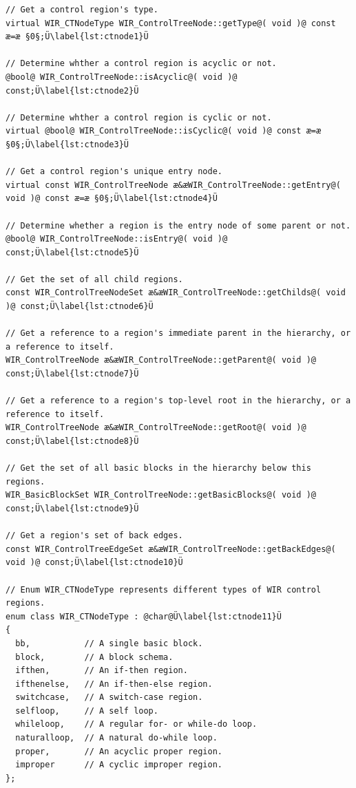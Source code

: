 \begin{lstlisting}[style=code,float=!t,caption={Public Interface of Class \texttt{WIR\_ControlTreeNode}},label=lst:ctnode]
// Get a control region's type.
virtual WIR_CTNodeType WIR_ControlTreeNode::getType@( void )@ const æ=æ §0§;Ü\label{lst:ctnode1}Ü

// Determine whther a control region is acyclic or not.
@bool@ WIR_ControlTreeNode::isAcyclic@( void )@ const;Ü\label{lst:ctnode2}Ü

// Determine whther a control region is cyclic or not.
virtual @bool@ WIR_ControlTreeNode::isCyclic@( void )@ const æ=æ §0§;Ü\label{lst:ctnode3}Ü

// Get a control region's unique entry node.
virtual const WIR_ControlTreeNode æ&æWIR_ControlTreeNode::getEntry@( void )@ const æ=æ §0§;Ü\label{lst:ctnode4}Ü

// Determine whether a region is the entry node of some parent or not.
@bool@ WIR_ControlTreeNode::isEntry@( void )@ const;Ü\label{lst:ctnode5}Ü

// Get the set of all child regions.
const WIR_ControlTreeNodeSet æ&æWIR_ControlTreeNode::getChilds@( void )@ const;Ü\label{lst:ctnode6}Ü

// Get a reference to a region's immediate parent in the hierarchy, or a reference to itself.
WIR_ControlTreeNode æ&æWIR_ControlTreeNode::getParent@( void )@ const;Ü\label{lst:ctnode7}Ü

// Get a reference to a region's top-level root in the hierarchy, or a reference to itself.
WIR_ControlTreeNode æ&æWIR_ControlTreeNode::getRoot@( void )@ const;Ü\label{lst:ctnode8}Ü

// Get the set of all basic blocks in the hierarchy below this regions.
WIR_BasicBlockSet WIR_ControlTreeNode::getBasicBlocks@( void )@ const;Ü\label{lst:ctnode9}Ü

// Get a region's set of back edges.
const WIR_ControlTreeEdgeSet æ&æWIR_ControlTreeNode::getBackEdges@( void )@ const;Ü\label{lst:ctnode10}Ü

// Enum WIR_CTNodeType represents different types of WIR control regions.
enum class WIR_CTNodeType : @char@Ü\label{lst:ctnode11}Ü
{
  bb,           // A single basic block.
  block,        // A block schema.
  ifthen,       // An if-then region.
  ifthenelse,   // An if-then-else region.
  switchcase,   // A switch-case region.
  selfloop,     // A self loop.
  whileloop,    // A regular for- or while-do loop.
  naturalloop,  // A natural do-while loop.
  proper,       // An acyclic proper region.
  improper      // A cyclic improper region.
};
\end{lstlisting}

